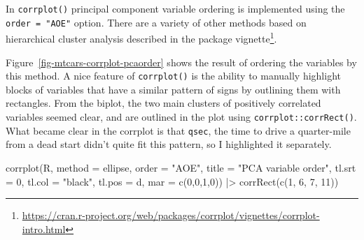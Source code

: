 \documentclass[
  letterpaper,
  10pt,
  krantz2]{krantz}
\makeatletter
\newenvironment{Shaded}{\begin{snugshade}}{\end{snugshade}}
\newcommand{\AttributeTok}[1]{\textcolor[rgb]{0.40,0.45,0.13}{#1}}
\newcommand{\DecValTok}[1]{\textcolor[rgb]{0.68,0.00,0.00}{#1}}
\newcommand{\FunctionTok}[1]{\textcolor[rgb]{0.28,0.35,0.67}{#1}}
\newcommand{\NormalTok}[1]{\textcolor[rgb]{0.00,0.23,0.31}{#1}}
\newcommand{\SpecialCharTok}[1]{\textcolor[rgb]{0.37,0.37,0.37}{#1}}
\newcommand{\StringTok}[1]{\textcolor[rgb]{0.13,0.47,0.30}{#1}}
\providecommand{\href}[2]{#2\footnote{\url{#1}}}
\newenvironment{kframe}{%
  \medskip{}
  \setlength{\fboxsep}{.8em}
  \def\at@end@of@kframe{}%
  \ifinner\ifhmode%
  \def\at@end@of@kframe{\end{minipage}}%
  \begin{minipage}{\columnwidth}%
  \fi\fi%
  \def\FrameCommand##1{\hskip\@totalleftmargin \hskip-\fboxsep
  \colorbox{shadecolor}{##1}\hskip-\fboxsep
      \hskip-\linewidth \hskip-\@totalleftmargin \hskip\columnwidth}%
  \MakeFramed {\advance\hsize-\width
    \@totalleftmargin\z@ \linewidth\hsize
    \@setminipage}}%
{\par\unskip\endMakeFramed%
  \at@end@of@kframe}
\renewenvironment{Shaded}{\begin{kframe}}{\end{kframe}}
\makeatother
\begin{document}
In \texttt{corrplot()} principal component variable ordering is
implemented using the \texttt{order\ =\ "AOE"} option. There are a
variety of other methods based on hierarchical cluster analysis
described in the
\href{https://cran.r-project.org/web/packages/corrplot/vignettes/corrplot-intro.html}{package
vignette}.

Figure~\ref{fig-mtcars-corrplot-pcaorder} shows the result of ordering
the variables by this method. A nice feature of \texttt{corrplot()} is
the ability to manually highlight blocks of variables that have a
similar pattern of signs by outlining them with rectangles. From the
biplot, the two main clusters of positively correlated variables seemed
clear, and are outlined in the plot using \texttt{corrplot::corrRect()}.
What became clear in the corrplot is that \texttt{qsec}, the time to
drive a quarter-mile from a dead start didn't quite fit this pattern, so
I highlighted it separately.

\begin{Shaded}
\begin{Highlighting}[]
\FunctionTok{corrplot}\NormalTok{(R, }
         \AttributeTok{method =} \StringTok{\textquotesingle{}ellipse\textquotesingle{}}\NormalTok{, }
         \AttributeTok{order =} \StringTok{"AOE"}\NormalTok{,}
         \AttributeTok{title =} \StringTok{"PCA variable order"}\NormalTok{,}
         \AttributeTok{tl.srt =} \DecValTok{0}\NormalTok{, }\AttributeTok{tl.col =} \StringTok{"black"}\NormalTok{, }\AttributeTok{tl.pos =} \StringTok{\textquotesingle{}d\textquotesingle{}}\NormalTok{,}
         \AttributeTok{mar =} \FunctionTok{c}\NormalTok{(}\DecValTok{0}\NormalTok{,}\DecValTok{0}\NormalTok{,}\DecValTok{1}\NormalTok{,}\DecValTok{0}\NormalTok{)) }\SpecialCharTok{|\textgreater{}}
  \FunctionTok{corrRect}\NormalTok{(}\FunctionTok{c}\NormalTok{(}\DecValTok{1}\NormalTok{, }\DecValTok{6}\NormalTok{, }\DecValTok{7}\NormalTok{, }\DecValTok{11}\NormalTok{))}
\end{Highlighting}
\end{Shaded}
\end{document}

